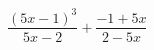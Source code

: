 \begin{ex}[type=expression]
	\begin{condition}
		\(\dfrac{(5x-1)^3}{5x-2}+\dfrac{-1+5x}{2-5x}\)
	\end{condition}
\end{ex}